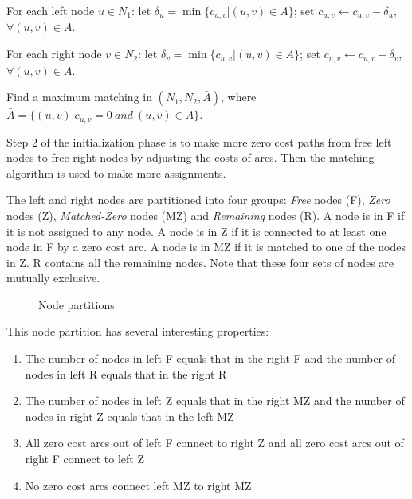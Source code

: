 
\begin{enumerate}
{\small\it
\item For each left node $u\in N_1$: 
let $\delta_u
=\min \{ c_{u,v}|(u,v)\in A\}$; set $c_{u,v} \leftarrow c_{u,v} - \delta_u$,
$\forall (u,v)\in A$.

\item For each right node $v\in N_2$: 
let $\delta_v
=\min \{ c_{u,v}|(u,v)\in A\}$; set $c_{u,v} \leftarrow c_{u,v} - \delta_v$,
$\forall (u,v)\in A$.

\item Find a maximum matching in $(N_1,N_2,\bar A)$, where
$\bar A =\{(u,v)|c_{u,v} = 0\ and\ (u,v)\in A\}$.
}
\end{enumerate}
\vskip 5pt

Step 2 of the initialization phase is to make more zero cost
paths from free left nodes to free right nodes by adjusting the costs
of arcs. Then the matching algorithm is used to make more assignments.

The left and right nodes are partitioned into four groups: {\it Free}
nodes (F), {\it Zero} nodes (Z), {\it Matched-Zero} nodes (MZ) and
{\it Remaining} nodes (R).  A node is in F if it is not assigned to
any node. A node is in Z if it is connected to at least one node in F
by a zero cost arc. A node is in MZ if it is matched to one of the
nodes in Z. R contains all the remaining nodes.  Note that these four
sets of nodes are mutually exclusive.

\begin{figure}[htb]
{}
\caption{\label{figg1}Node partitions }
\end{figure}

This node partition has several interesting properties:

\begin{enumerate}

\item The number of nodes in left F equals that in the right F and
the number of nodes in left R equals that in the right R

\item The number of nodes in left Z equals that in the right MZ and
the number of nodes in right Z equals that in the left MZ

\item All zero cost arcs out of left F connect to right Z and
all zero cost arcs out of right F connect to left Z

\item No zero cost arcs connect left MZ to right MZ

\end{enumerate}

